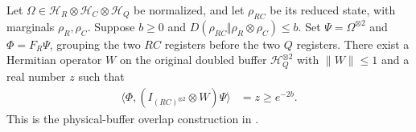 \begin{theorem}
    \label{thm:physical_buffer_controlled_overlap}
    \leanok
    Let $\Omega\in\mathcal H_R\otimes\mathcal H_C\otimes\mathcal H_Q$
    be normalized, and let $\rho_{RC}$ be its reduced state, with marginals
    $\rho_R,\rho_C$.
    Suppose $b\ge0$ and
    $D(\rho_{RC}\Vert\rho_R\otimes\rho_C)\le b$.
    Set $\Psi=\Omega^{\otimes2}$ and $\Phi=F_R\Psi$, grouping the two
    $RC$ registers before the two $Q$ registers.
    There exist a Hermitian operator $W$ on the original doubled buffer
    $\mathcal H_Q^{\otimes2}$ with $\|W\|\le1$ and a real number $z$ such that
    \begin{align}
        \langle\Phi,(I_{(RC)^{\otimes2}}\otimes W)\Psi\rangle
        &=z\ge e^{-2b}.
        \label{eq:buffer_controlled_overlap}
    \end{align}
    This is the physical-buffer overlap construction in
    \cite{OpenAI2026AreaLaw}.
\end{theorem}
